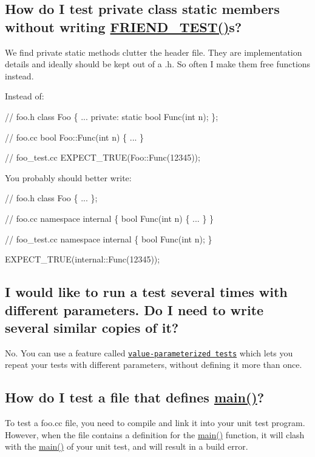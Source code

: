\subsection*{How do I test private class static members without writing \hyperlink{gtest__prod_8h_a8d443b4cc1d87a7a17943b8fbdbf3910}{F\+R\+I\+E\+N\+D\+\_\+\+T\+E\+S\+T()}s?}

We find private static methods clutter the header file. They are implementation details and ideally should be kept out of a .h. So often I make them free functions instead.

Instead of\+: 
\begin{DoxyCode}
// foo.h
class Foo \{
  ...
 private:
  static bool Func(int n);
\};

// foo.cc
bool Foo::Func(int n) \{ ... \}

// foo\_test.cc
EXPECT\_TRUE(Foo::Func(12345));
\end{DoxyCode}


You probably should better write\+: 
\begin{DoxyCode}
// foo.h
class Foo \{
  ...
\};

// foo.cc
namespace internal \{
  bool Func(int n) \{ ... \}
\}

// foo\_test.cc
namespace internal \{
  bool Func(int n);
\}

EXPECT\_TRUE(internal::Func(12345));
\end{DoxyCode}


\subsection*{I would like to run a test several times with different parameters. Do I need to write several similar copies of it?}

No. You can use a feature called \href{V1_7_AdvancedGuide.md#Value_Parameterized_Tests}{\tt value-\/parameterized tests} which lets you repeat your tests with different parameters, without defining it more than once.

\subsection*{How do I test a file that defines \hyperlink{app_2main_8cpp_ae66f6b31b5ad750f1fe042a706a4e3d4}{main()}?}

To test a {\ttfamily foo.\+cc} file, you need to compile and link it into your unit test program. However, when the file contains a definition for the {\ttfamily \hyperlink{app_2main_8cpp_ae66f6b31b5ad750f1fe042a706a4e3d4}{main()}} function, it will clash with the {\ttfamily \hyperlink{app_2main_8cpp_ae66f6b31b5ad750f1fe042a706a4e3d4}{main()}} of your unit test, and will result in a build error.

